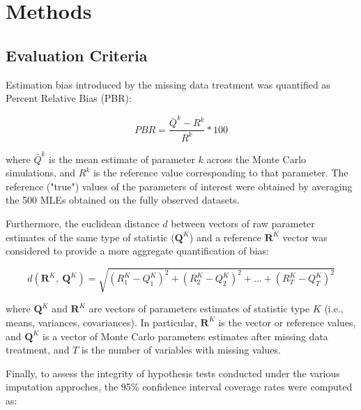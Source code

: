 \maketitle
\section{Methods}





\subsection{Evaluation Criteria}

Estimation bias introduced by the missing data treatment was quantified as Percent Relative Bias (PBR):

\begin{equation}
	PBR = \frac{\bar{Q}^{k} - R^{k} }{R^{k}}*100 \label{eq:bias_p}
\end{equation}

where $\bar{Q}^{k}$ is the mean estimate of parameter $k$ across the Monte Carlo simulations, and $R^{k}$ is the 
reference value corresponding to that parameter. The reference ("true") values of the parameters of interest were 
obtained by averaging the 500 MLEs obtained on the fully observed datasets. 

Furthermore, the euclidean distance $d$ between vectors of raw parameter estimates of the same type of statistic 
($\bm{Q}^{K}$) and a reference $\bm{R}^{K}$ vector was considered to provide a more aggregate quantification of bias:

\begin{equation}
	d(\bm{R}^{K}, \: \bm{Q}^{K}) = 
		\sqrt{ 
			(R^{K}_{1} - Q^{K}_{1})^{2} + 
			(R^{K}_{2} - Q^{K}_{2})^{2} + 
			... + 
			(R^{K}_{T} - Q^{K}_{T})^{2}
		} 
			\label{eq:eu_dist}
\end{equation}

where $\bm{Q}^{K}$ and $\bm{R}^{K}$ are vectors of parameters estimates of statistic type $K$ (i.e., means, variances, covariances). 
In particular, $\bm{R}^{K}$ is the vector or reference values, and $\bm{Q}^{K}$ is a vector of Monte Carlo parameters estimates after 
missing data treatment, and $T$ is the number of variables with missing values.

Finally, to assess the integrity of hypothesis tests conducted under the various imputation approches, the 95\% confidence 
interval coverage rates were computed as:

